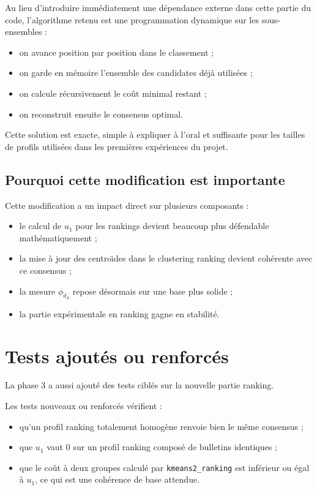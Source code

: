 \documentclass[11pt,a4paper]{article}
\begin{document}
Au lieu d'introduire imm\'ediatement une d\'ependance externe dans cette partie du code, l'algorithme retenu est une programmation dynamique sur les sous-ensembles :
\begin{itemize}[leftmargin=*]
    \item on avance position par position dans le classement ;
    \item on garde en m\'emoire l'ensemble des candidates d\'ej\`a utilis\'ees ;
    \item on calcule r\'ecursivement le co\^ut minimal restant ;
    \item on reconstruit ensuite le consensus optimal.
\end{itemize}

Cette solution est exacte, simple \`a expliquer \`a l'oral et suffisante pour les tailles de profils utilis\'ees dans les premi\`eres exp\'eriences du projet.

\subsection{Pourquoi cette modification est importante}

Cette modification a un impact direct sur plusieurs composants :
\begin{itemize}[leftmargin=*]
    \item le calcul de \(u_1\) pour les rankings devient beaucoup plus d\'efendable math\'ematiquement ;
    \item la mise \`a jour des centro\"\i des dans le clustering ranking devient coh\'erente avec ce consensus ;
    \item la mesure \(\phi_{d_S}\) repose d\'esormais sur une base plus solide ;
    \item la partie exp\'erimentale en ranking gagne en stabilit\'e.
\end{itemize}

\section{Tests ajout\'es ou renforc\'es}

La phase 3 a aussi ajout\'e des tests cibl\'es sur la nouvelle partie ranking.

Les tests nouveaux ou renforc\'es v\'erifient :
\begin{itemize}[leftmargin=*]
    \item qu'un profil ranking totalement homog\`ene renvoie bien le m\^eme consensus ;
    \item que \(u_1\) vaut \(0\) sur un profil ranking compos\'e de bulletins identiques ;
    \item que le co\^ut \`a deux groupes calcul\'e par \texttt{kmeans2\_ranking} est inf\'erieur ou \'egal \`a \(u_1\), ce qui est une coh\'erence de base attendue.
\end{itemize}
\end{document}
